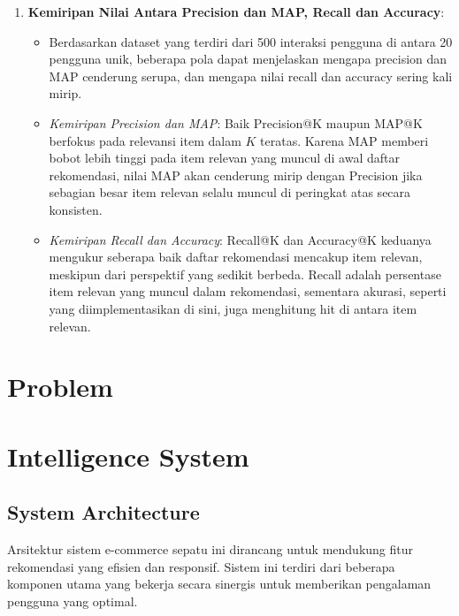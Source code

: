 \documentclass[journal,article,submit,pdftex,moreauthors]{Definitions/mdpi}
\begin{document}
\begin{enumerate}
    \item \textbf{Kemiripan Nilai Antara Precision dan MAP, Recall dan Accuracy}:
    \begin{itemize}
        \item Berdasarkan dataset yang terdiri dari 500 interaksi pengguna di antara 20 pengguna unik, beberapa pola dapat menjelaskan mengapa precision dan MAP cenderung serupa, dan mengapa nilai recall dan accuracy sering kali mirip.
        \item \textit{Kemiripan Precision dan MAP}: Baik Precision@K maupun MAP@K berfokus pada relevansi item dalam \( K \) teratas. Karena MAP memberi bobot lebih tinggi pada item relevan yang muncul di awal daftar rekomendasi, nilai MAP akan cenderung mirip dengan Precision jika sebagian besar item relevan selalu muncul di peringkat atas secara konsisten.
        \item \textit{Kemiripan Recall dan Accuracy}: Recall@K dan Accuracy@K keduanya mengukur seberapa baik daftar rekomendasi mencakup item relevan, meskipun dari perspektif yang sedikit berbeda. Recall adalah persentase item relevan yang muncul dalam rekomendasi, sementara akurasi, seperti yang diimplementasikan di sini, juga menghitung hit di antara item relevan.
    \end{itemize}
\end{enumerate}


\section{Problem}

\section{Intelligence System}

\subsection{System Architecture}
Arsitektur sistem e-commerce sepatu ini dirancang untuk mendukung fitur rekomendasi yang efisien dan responsif. Sistem ini terdiri dari beberapa komponen utama yang bekerja secara sinergis untuk memberikan pengalaman pengguna yang optimal.
\end{document}

